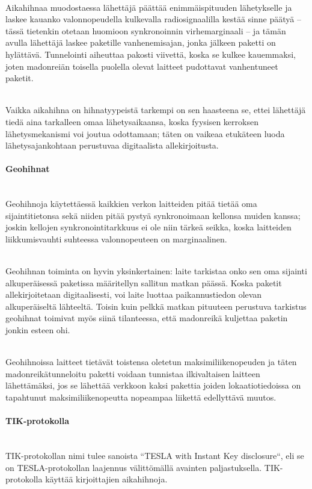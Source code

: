 \documentclass[finnish]{tktltiki2}
\theoremstyle{definition}
\theoremstyle{remark}
\begin{document}
\noindent \\
Aikahihnaa muodostaessa lähettäjä päättää enimmäispituuden lähetykselle ja laskee kauanko valonnopeudella kulkevalla radiosignaalilla kestää sinne päätyä – tässä tietenkin otetaan huomioon synkronoinnin virhemarginaali – ja tämän avulla lähettäjä laskee paketille vanhenemisajan, jonka jälkeen paketti on hylättävä. Tunnelointi aiheuttaa pakosti viivettä, koska se kulkee kauemmaksi, joten madonreiän toisella puolella olevat laitteet pudottavat vanhentuneet paketit.

\noindent \\
Vaikka aikahihna on hihnatyypeistä tarkempi on sen haasteena se, ettei lähettäjä tiedä aina tarkalleen omaa lähetysaikaansa, koska fyysisen kerroksen lähetysmekanismi voi joutua odottamaan; täten on vaikeaa etukäteen luoda lähetysajankohtaan perustuvaa digitaalista allekirjoitusta.

\paragraph{Geohihnat}
\noindent \\
Geohihnoja käytettäessä kaikkien verkon laitteiden pitää tietää oma sijaintitietonsa sekä niiden pitää pystyä synkronoimaan kellonsa muiden kanssa; joskin kellojen synkronointitarkkuus ei ole niin tärkeä seikka, koska laitteiden liikkumisvauhti suhteessa valonnopeuteen on marginaalinen.

\noindent \\
Geohihnan toiminta on hyvin yksinkertainen: laite tarkistaa onko sen oma sijainti alkuperäisessä paketissa määritellyn sallitun matkan päässä. Koska paketit allekirjoitetaan digitaalisesti, voi laite luottaa paikannustiedon olevan alkuperäiseltä lähteeltä. Toisin kuin pelkkä matkan pituuteen perustuva tarkistus geohihnat toimivat myös siinä tilanteessa, että madonreikä kuljettaa paketin jonkin esteen ohi.

\noindent \\
Geohihnoissa laitteet tietävät toistensa oletetun maksimiliikenopeuden ja täten madonreikätunneloitu paketti voidaan tunnistaa ilkivaltaisen laitteen lähettämäksi, jos se lähettää verkkoon kaksi pakettia joiden lokaatiotiedoissa on tapahtunut maksimiliikenopeutta nopeampaa liikettä edellyttävä muutos.

\paragraph{TIK-protokolla} 
\noindent \\
TIK-protokollan nimi tulee sanoista ``TESLA with Instant Key disclosure``, eli se on TESLA-protokollan laajennus välittömällä avainten paljastuksella. TIK-protokolla käyttää kirjoittajien aikahihnoja.
\end{document}

